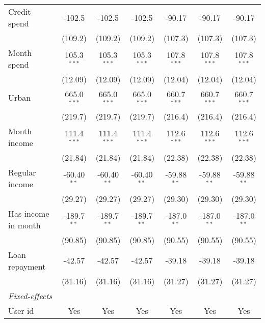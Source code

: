\begin{table}[htbp]
\begin{threeparttable}[b]
\begin{tabular}{lcccccc}
         Credit spend              & -102.5        & -102.5        & -102.5        & -90.17        & -90.17        & -90.17\\   
                                   & (109.2)       & (109.2)       & (109.2)       & (107.3)       & (107.3)       & (107.3)\\   
         Month spend               & 105.3$^{***}$ & 105.3$^{***}$ & 105.3$^{***}$ & 107.8$^{***}$ & 107.8$^{***}$ & 107.8$^{***}$\\   
                                   & (12.09)       & (12.09)       & (12.09)       & (12.04)       & (12.04)       & (12.04)\\   
         Urban                     & 665.0$^{***}$ & 665.0$^{***}$ & 665.0$^{***}$ & 660.7$^{***}$ & 660.7$^{***}$ & 660.7$^{***}$\\   
                                   & (219.7)       & (219.7)       & (219.7)       & (216.4)       & (216.4)       & (216.4)\\   
         Month income              & 111.4$^{***}$ & 111.4$^{***}$ & 111.4$^{***}$ & 112.6$^{***}$ & 112.6$^{***}$ & 112.6$^{***}$\\   
                                   & (21.84)       & (21.84)       & (21.84)       & (22.38)       & (22.38)       & (22.38)\\   
         Regular income            & -60.40$^{**}$ & -60.40$^{**}$ & -60.40$^{**}$ & -59.88$^{**}$ & -59.88$^{**}$ & -59.88$^{**}$\\   
                                   & (29.27)       & (29.27)       & (29.27)       & (29.30)       & (29.30)       & (29.30)\\   
         Has income in month       & -189.7$^{**}$ & -189.7$^{**}$ & -189.7$^{**}$ & -187.0$^{**}$ & -187.0$^{**}$ & -187.0$^{**}$\\   
                                   & (90.85)       & (90.85)       & (90.85)       & (90.55)       & (90.55)       & (90.55)\\   
         Loan repayment            & -42.57        & -42.57        & -42.57        & -39.18        & -39.18        & -39.18\\   
                                   & (31.16)       & (31.16)       & (31.16)       & (31.27)       & (31.27)       & (31.27)\\   
         \midrule
         \emph{Fixed-effects}\\
         User id                   & Yes           & Yes           & Yes           & Yes           & Yes           & Yes\\  

\end{tabular}
\end{threeparttable}
\end{table}
